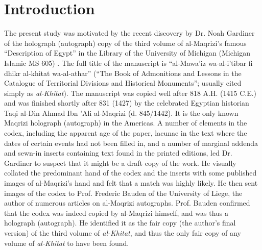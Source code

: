 \documentclass[conference,a4paper,twocolumn]{IEEEtran}
\begin{document}

%
\IEEEpeerreviewmaketitle


\section{Introduction}
\label{sec:introduction}
The present study was motivated by the recent discovery by Dr. Noah Gardiner of the holograph (autograph) copy of the third volume of al-Maqrizi's famous ``Description of Egypt'' in the Library of the University of Michigan (Michigan Islamic MS 605) \cite{Noah}. The full title of the manuscript is ``al-Mawa'iz wa-al-i'tibar fi dhikr al-khitat wa-al-athar'' (``The Book of Admonitions and Lessons in the Catalogue of Territorial Divisions and Historical Monuments''; usually cited simply as \textit{al-Khitat}). The manuscript was copied well after 818 A.H. (1415 C.E.) and was finished shortly after 831 (1427) by the celebrated Egyptian historian Taqi al-Din Ahmad Ibn 'Ali al-Maqrizi (d. 845/1442). It is the only known Maqrizi holograph (autograph) in the Americas. A number of elements in the codex, including the apparent age of the paper, lacunae in the text where the dates of certain events had not been filled in, and a number of marginal addenda and sewn-in inserts containing text found in the printed editions, led Dr. Gardiner to suspect that it might be a draft copy of the work. He visually collated the predominant hand of the codex and the inserts with some published images of al-Maqrizi's hand and felt that a match was highly likely. He then sent images of the codex to Prof. Frederic Bauden of the University of Liege, the author of numerous articles on al-Maqrizi autographs. Prof. Bauden confirmed that the codex was indeed copied by al-Maqrizi himself, and was thus a holograph (autograph). He identified it as the fair copy (the author's final version) of the third volume of \textit{al-Khitat}, and thus the only fair copy of any volume of \textit{al-Khitat} to have been found.
\end{document}
